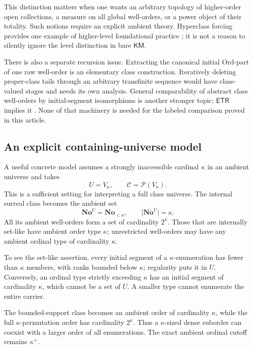 \documentclass[11pt]{article}
\theoremstyle{definition}
\theoremstyle{remark}
\newcommand{\No}{\mathbf{No}}
\newcommand{\Ord}{\mathrm{Ord}}
\newcommand{\KM}{\mathsf{KM}}
\newcommand{\ETR}{\mathsf{ETR}}
\newcommand{\card}[1]{\lvert #1\rvert}
\begin{document}
This distinction matters when one wants an arbitrary topology
of higher-order open collections, a measure on all global
well-orders, or a power object of their totality. Such notions
require an explicit ambient theory. Hyperclass forcing provides
one example of higher-level foundational practice
\cite{AntosFriedman}; it is not a reason to silently ignore the
level distinction in bare \(\KM\).

There is also a separate recursion issue. Extracting the
canonical initial \(\Ord\)-part of one raw well-order is an
elementary class construction. Iteratively deleting proper-class
tails through an arbitrary transfinite sequence would have
class-valued stages and needs its own analysis. General
comparability of abstract class well-orders by initial-segment
isomorphisms is another stronger topic; \(\ETR\) implies it
\cite{HamkinsWoodin}. None of that machinery is needed for
the labeled comparison proved in this article.

\subsection{An explicit containing-universe model}

A useful concrete model assumes a strongly inaccessible cardinal
\(\kappa\) in an ambient universe and takes
\[
 U=V_\kappa,\qquad \mathcal C=\mathcal P(V_\kappa).
\]
This is a sufficient setting for interpreting a full class
universe. The internal surreal class becomes the ambient set
\[
 \No^U=\No_{<\kappa},\qquad \card{\No^U}=\kappa.
\]
All its ambient well-orders form a set of cardinality \(2^\kappa\).
Those that are internally set-like have ambient order type
\(\kappa\); unrestricted well-orders may have any ambient
ordinal type of cardinality \(\kappa\).

To see the set-like assertion, every initial segment of a
\(\kappa\)-enumeration has fewer than \(\kappa\) members, with
ranks bounded below \(\kappa\); regularity puts it in \(U\).
Conversely, an ordinal type strictly exceeding \(\kappa\) has
an initial segment of cardinality \(\kappa\), which cannot be
a set of \(U\). A smaller type cannot enumerate the entire
carrier.

The bounded-support class becomes an ambient order of cardinality
\(\kappa\), while the full \(\kappa\)-permutation order has
cardinality \(2^\kappa\). Thus a \(\kappa\)-sized dense suborder
can coexist with a larger order of all enumerations. The exact
ambient ordinal cutoff remains \(\kappa^+\).
\end{document}

